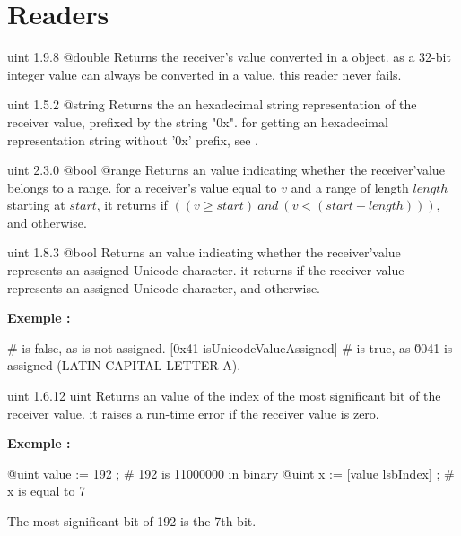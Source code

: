 \section{Readers}

{uint}
{1.9.8}
{@double}
{Returns the receiver's value converted in a  object.}
{as a 32-bit integer value can always be converted in a  value, this reader never fails.}



{uint}
{1.5.2}
{@string}
{Returns the an hexadecimal string representation of the receiver value, prefixed by the string "0x".}
{for getting an hexadecimal representation string without '0x' prefix, see .}



{uint}
{2.3.0}
{@bool}
{@range}
{Returns an  value indicating whether the receiver'value belongs to a range.}
{for a receiver's value equal to $v$ and a range of length $length$ starting at $start$, it returns  if $((v \geqslant start)~and~(v<(start+length)))$, and  otherwise.}



{uint}
{1.8.3}
{@bool}
{Returns an  value indicating whether the receiver'value represents an assigned Unicode character.}
{it returns  if the receiver value represents an assigned Unicode character,  and otherwise.}

\textbf{Exemple :}
\begin{galgascode}
 # is false, as \uFFFF is not assigned.
[0x41 isUnicodeValueAssigned] # is true, as \u0041 is assigned (LATIN CAPITAL LETTER A).
\end{galgascode}



{uint}
{1.6.12}
{uint}
{Returns an  value of the index of the most significant bit of the receiver value.}
{it raises a run-time error if the receiver value is zero.}

\textbf{Exemple :}
\begin{galgascode}
@uint value := 192 ; # 192 is 11000000 in binary
@uint x := [value lsbIndex] ; # x is equal to 7
\end{galgascode}

The most significant bit of 192 is the 7th bit.




